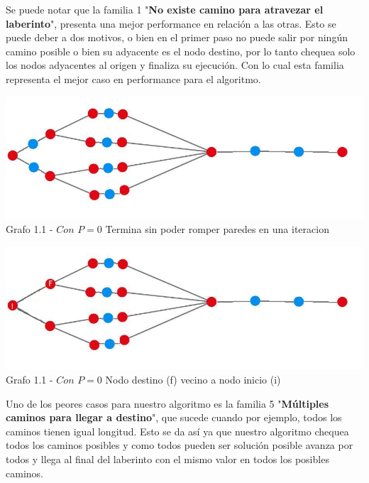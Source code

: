 Se puede notar que la familia 1 "\textbf{No existe camino para atravezar el laberinto}", presenta una mejor performance en relaci\'on a las otras. Esto se puede deber a dos motivos, o bien en el primer paso no puede salir por ning\'un camino posible o bien su adyacente es el nodo destino, por lo tanto chequea solo los nodos adyacentes al origen y finaliza su ejecuci\'on. Con lo cual esta familia representa el mejor caso en performance para el algoritmo.

\vspace*{0.3cm} \vspace*{0.3cm}
  \begin{center}
\includegraphics[scale=0.7]{./EJ1/ej1grafomejorcaso.jpeg}
{Grafo 1.1 - $Con$ $P=0$ Termina sin poder romper paredes en una iteracion}
  \end{center}
  \vspace*{0.3cm}

\vspace*{0.3cm} \vspace*{0.3cm}
  \begin{center}
\includegraphics[scale=0.7]{./EJ1/ej1grafomejorcaso2.jpeg}
{Grafo 1.1 - $Con$ $P=0$ Nodo destino (f) vecino a nodo inicio (i)}
  \end{center}
  \vspace*{0.3cm}

Uno de los peores casos para nuestro algoritmo es la familia 5 "\textbf{Múltiples caminos para llegar a destino}", que sucede cuando por ejemplo, todos los caminos tienen igual longitud. Esto se da as\'i ya que nuestro algoritmo chequea todos los caminos posibles y como todos pueden ser soluci\'on posible avanza por todos y llega al final del laberinto con el mismo valor en todos los posibles caminos.\\

